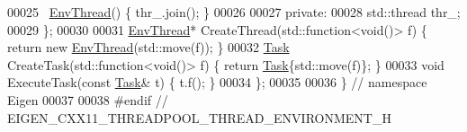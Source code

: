 \begin{DoxyCode}
00025     ~\hyperlink{class_eigen_1_1_stl_thread_environment_1_1_env_thread}{EnvThread}() \{ thr\_.join(); \}
00026 
00027    \textcolor{keyword}{private}:
00028     std::thread thr\_;
00029   \};
00030 
00031   \hyperlink{class_eigen_1_1_stl_thread_environment_1_1_env_thread}{EnvThread}* CreateThread(std::function<\textcolor{keywordtype}{void}()> f) \{ \textcolor{keywordflow}{return} \textcolor{keyword}{new} 
      \hyperlink{class_eigen_1_1_stl_thread_environment_1_1_env_thread}{EnvThread}(std::move(f)); \}
00032   \hyperlink{struct_eigen_1_1_stl_thread_environment_1_1_task}{Task} CreateTask(std::function<\textcolor{keywordtype}{void}()> f) \{ \textcolor{keywordflow}{return} \hyperlink{struct_eigen_1_1_stl_thread_environment_1_1_task}{Task}\{std::move(f)\}; \}
00033   \textcolor{keywordtype}{void} ExecuteTask(\textcolor{keyword}{const} \hyperlink{struct_eigen_1_1_stl_thread_environment_1_1_task}{Task}& t) \{ t.f(); \}
00034 \};
00035 
00036 \}  \textcolor{comment}{// namespace Eigen}
00037 
00038 \textcolor{preprocessor}{#endif  // EIGEN\_CXX11\_THREADPOOL\_THREAD\_ENVIRONMENT\_H}
\end{DoxyCode}
